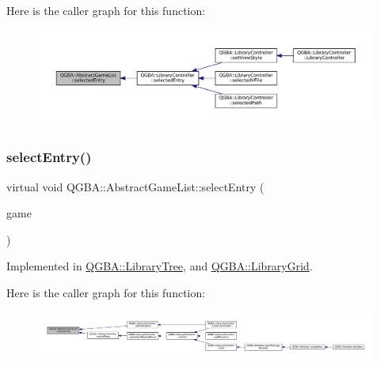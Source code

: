 Here is the caller graph for this function\+:
\nopagebreak
\begin{figure}[H]
\begin{center}
\leavevmode
\includegraphics[width=350pt]{class_q_g_b_a_1_1_abstract_game_list_ac456bb5443e0b60ff7fb6e3d64fbb338_icgraph}
\end{center}
\end{figure}
\mbox{\label{class_q_g_b_a_1_1_abstract_game_list_af39316d3b224014e8a2763561e1cdcdd}} 
\subsubsection{\texorpdfstring{select\+Entry()}{selectEntry()}}
{\footnotesize\ttfamily virtual void Q\+G\+B\+A\+::\+Abstract\+Game\+List\+::select\+Entry (\begin{DoxyParamCaption}\item[{\mbox{\hyperlink{namespace_q_g_b_a_a201fa9f2cb8f778666a134ba81909358}{Library\+Entry\+Ref}}}]{game }\end{DoxyParamCaption})\hspace{0.3cm}{\ttfamily [pure virtual]}}



Implemented in \mbox{\hyperlink{class_q_g_b_a_1_1_library_tree_a6d3e6a1d0b807bd7765e2b02e7a86d68}{Q\+G\+B\+A\+::\+Library\+Tree}}, and \mbox{\hyperlink{class_q_g_b_a_1_1_library_grid_a2fa487333a0fffa668823370c73477c1}{Q\+G\+B\+A\+::\+Library\+Grid}}.

Here is the caller graph for this function\+:
\nopagebreak
\begin{figure}[H]
\begin{center}
\leavevmode
\includegraphics[width=350pt]{class_q_g_b_a_1_1_abstract_game_list_af39316d3b224014e8a2763561e1cdcdd_icgraph}
\end{center}
\end{figure}
\mbox{\label{class_q_g_b_a_1_1_abstract_game_list_af2f88dba7da390c2d89a362bafc5a6e4}} 
